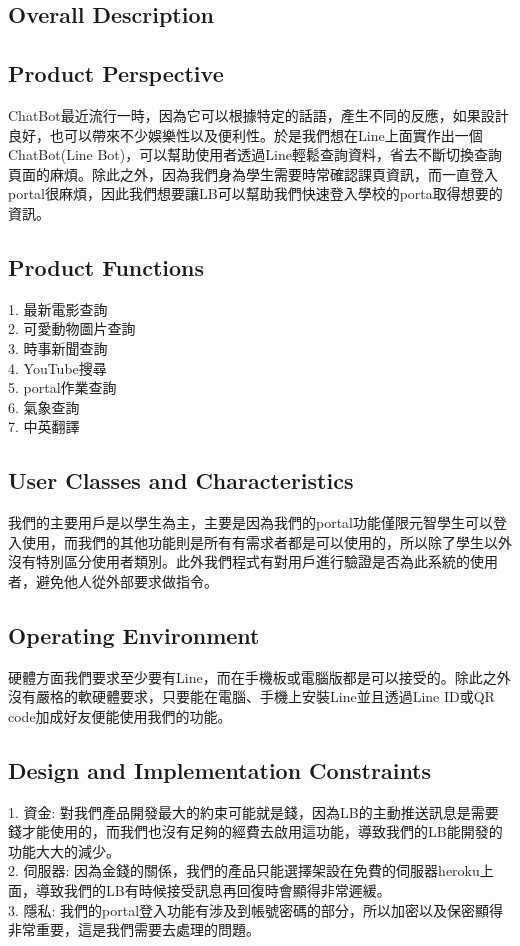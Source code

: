 \documentclass{scrreprt}
\begin{document}
\begin{CJK}{UTF8}{bkai}
\chapter{Overall Description}

\section{Product Perspective}
ChatBot最近流行一時，因為它可以根據特定的話語，產生不同的反應，如果設計良好，也可以帶來不少娛樂性以及便利性。於是我們想在Line上面實作出一個ChatBot(Line Bot)，可以幫助使用者透過Line輕鬆查詢資料，省去不斷切換查詢頁面的麻煩。除此之外，因為我們身為學生需要時常確認課頁資訊，而一直登入portal很麻煩，因此我們想要讓LB可以幫助我們快速登入學校的porta取得想要的資訊。

\section{Product Functions}
1.  最新電影查詢\\
2.  可愛動物圖片查詢\\
3.  時事新聞查詢\\
4.  YouTube搜尋\\
5.  portal作業查詢\\
6.  氣象查詢\\
7.  中英翻譯\\

\section{User Classes and Characteristics}
我們的主要用戶是以學生為主，主要是因為我們的portal功能僅限元智學生可以登入使用，而我們的其他功能則是所有有需求者都是可以使用的，所以除了學生以外沒有特別區分使用者類別。此外我們程式有對用戶進行驗證是否為此系統的使用者，避免他人從外部要求做指令。

\section{Operating Environment}
硬體方面我們要求至少要有Line，而在手機板或電腦版都是可以接受的。除此之外沒有嚴格的軟硬體要求，只要能在電腦、手機上安裝Line並且透過Line ID或QR code加成好友便能使用我們的功能。

\section{Design and Implementation Constraints}
1.  資金: 對我們產品開發最大的約束可能就是錢，因為LB的主動推送訊息是需要錢才能使用的，而我們也沒有足夠的經費去啟用這功能，導致我們的LB能開發的功能大大的減少。\\
2.  伺服器: 因為金錢的關係，我們的產品只能選擇架設在免費的伺服器heroku上面，導致我們的LB有時候接受訊息再回復時會顯得非常遲緩。\\
3.  隱私: 我們的portal登入功能有涉及到帳號密碼的部分，所以加密以及保密顯得非常重要，這是我們需要去處理的問題。\\



\end{CJK}
\end{document}

